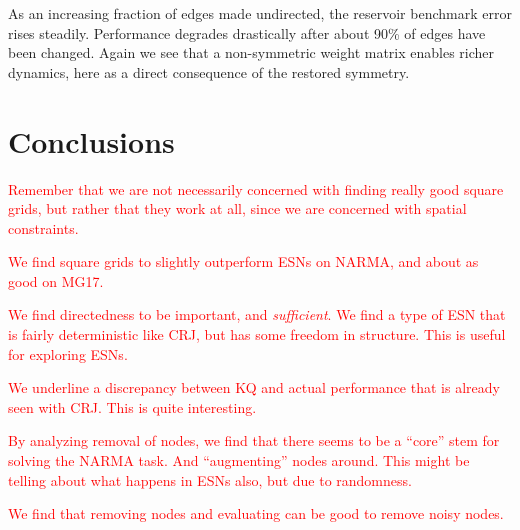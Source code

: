 As an increasing fraction of edges made undirected, the reservoir benchmark
error rises steadily. Performance degrades drastically after about 90\% of edges
have been changed. Again we see that a non-symmetric weight matrix enables
richer dynamics, here as a direct consequence of the restored symmetry.

\section{Conclusions}

\textcolor{red}{
  Remember that we are not necessarily concerned with finding really good square
grids, but rather that they work at all, since we are concerned with spatial
constraints.
}

\textcolor{red}{
  We find square grids to slightly outperform ESNs on NARMA, and about as good
on MG17.
}

\textcolor{red}{
  We find directedness to be important, and \textit{sufficient}. We find a type
of ESN that is fairly deterministic like CRJ, but has some freedom in
structure. This is useful for exploring ESNs.
}

\textcolor{red}{
  We underline a discrepancy between KQ and actual performance that is already
seen with CRJ. This is quite interesting.
}

\textcolor{red}{
  By analyzing removal of nodes, we find that there seems to be a ``core'' stem
for solving the NARMA task. And ``augmenting'' nodes around. This might be
telling about what happens in ESNs also, but due to randomness.
}

\textcolor{red}{
  We find that removing nodes and evaluating can be good to remove noisy nodes.
}


